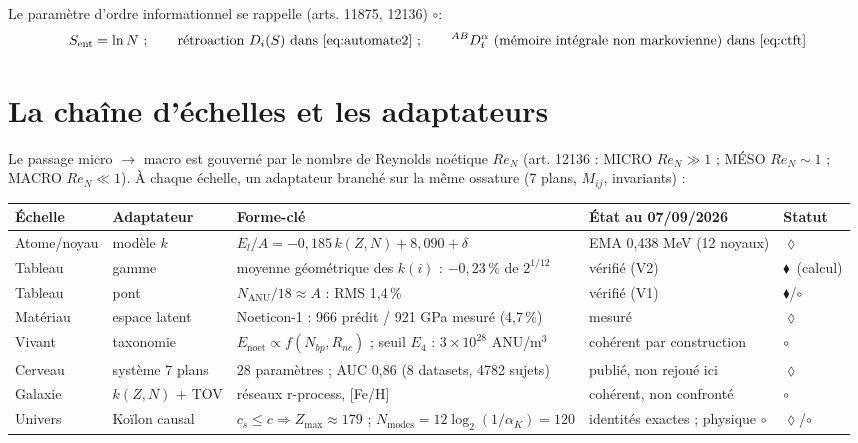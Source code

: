 \documentclass[11pt,a4paper]{article}
\newcommand{\SET}{\ensuremath{\blacklozenge}}
\newcommand{\SMOD}{\ensuremath{\lozenge}}
\newcommand{\SCONJ}{\ensuremath{\circ}}
\newcommand{\sent}{S_{\mathrm{ent}}}
\newcommand{\Anu}{\mathrm{ANU}}
\begin{document}
Le paramètre d'ordre informationnel se rappelle (arts. 11875, 12136) \SCONJ :
\begin{equation}
\sent = \ln N \ ;\qquad \text{rétroaction } D_i(S) \text{ dans \eqref{eq:automate2}} \ ;\qquad {}^{AB}D_t^{\alpha}\ \text{(mémoire intégrale non markovienne) dans \eqref{eq:ctft}}
\end{equation}

\section{La chaîne d'échelles et les adaptateurs}
\label{sec:echelles}

Le passage micro $\to$ macro est gouverné par le nombre de Reynolds noétique $Re_N$ (art. 12136 : MICRO $Re_N\gg1$ ; MÉSO $Re_N\sim1$ ; MACRO $Re_N\ll1$). À chaque échelle, un adaptateur branché sur la même ossature (7 plans, $M_{ij}$, invariants) :

\begin{center}
\small
\begin{tabular}{@{}lllll@{}}
\toprule
Échelle & Adaptateur & Forme-clé & État au 07/09/2026 & Statut \\
\midrule
Atome/noyau & modèle $k$ & $E_l/A = -0{,}185\,k(Z,N) + 8{,}090 + \delta$ & EMA 0,438 MeV (12 noyaux) & \SMOD \\
Tableau & gamme & moyenne géométrique des $k(i)$ : $-0{,}23\,\%$ de $2^{1/12}$ & vérifié (V2) & \SET\ (calcul) \\
Tableau & pont & $N_{\Anu}/18 \approx A$ : RMS 1,4\,\% & vérifié (V1) & \SET/\SCONJ \\
Matériau & espace latent & Noeticon-1 : 966 prédit / 921 GPa mesuré (4,7\,\%) & mesuré & \SMOD \\
Vivant & taxonomie & $E_{\mathrm{noet}} \propto f(N_{bp}, R_{nc})$ ; seuil $E_4$ : $3\times10^{28}$ $\Anu$/m$^3$ & cohérent par construction & \SCONJ \\
Cerveau & système 7 plans & $28$ paramètres ; AUC 0,86 (8 datasets, 4782 sujets) & publié, non rejoué ici & \SMOD \\
Galaxie & $k(Z,N)$ + TOV & réseaux r-process, [Fe/H] & cohérent, non confronté & \SCONJ \\
Univers & Koïlon causal & $c_s \le c \Rightarrow Z_{\max}\approx179$ ; $N_{\mathrm{modes}} = 12\log_2(1/\alpha_K) = 120$ & identités exactes ; physique \SCONJ & \SMOD/\SCONJ \\
\bottomrule
\end{tabular}
\end{center}
\end{document}

